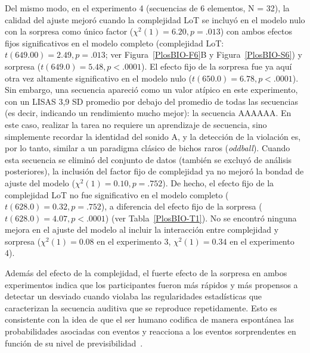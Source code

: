 Del mismo modo, en el experimento 4 (secuencias de 6 elementos, N = 32), la calidad del ajuste mejoró cuando la complejidad LoT se incluyó en el modelo nulo con la sorpresa como único factor ($\chi^2(1) = 6.20, p= .013$) con ambos efectos fijos significativos en el modelo completo (complejidad LoT: $t (649.00) = 2.49, p= .013$; ver Figura~\ref{PlosBIO-F6}B y Figura~\ref{PlosBIO-S6}) y sorpresa ($t (649.0) = 5.4 8, p < .0001$). El efecto fijo de la sorpresa fue ya aquí otra vez altamente significativo en el modelo nulo ($t (650.0) = 6.78, p < .0001$). Sin embargo, una secuencia apareció como un valor atípico en este experimento, con un LISAS 3,9 SD promedio por debajo del promedio de todas las secuencias (es decir, indicando un rendimiento mucho mejor): la secuencia AAAAAA. En este caso, realizar la tarea no requiere un aprendizaje de secuencia, sino simplemente recordar la identidad del sonido A, y la detección de la violación es, por lo tanto, similar a un paradigma clásico de bichos raros (\textit{oddball}). Cuando esta secuencia se eliminó del conjunto de datos (también se excluyó de análisis posteriores), la inclusión del factor fijo de complejidad ya no mejoró la bondad de ajuste del modelo ($\chi^2 (1) = 0.10, p = .752$). De hecho, el efecto fijo de la complejidad LoT no fue significativo en el modelo completo ($t (628.0) = 0.32, p = .752$), a diferencia del efecto fijo de la sorpresa ($t (628.0) = 4.07, p < .0001$) (ver Tabla~\ref{PlosBIO-T1}). No se encontró ninguna mejora en el ajuste del modelo al incluir la interacción entre complejidad y sorpresa ($\chi^2(1) = 0.08$ en el experimento 3, $\chi^2(1) = 0.34$ en el experimento 4).


Además del efecto de la complejidad, el fuerte efecto de la sorpresa en ambos experimentos indica que los participantes fueron más rápidos y más propensos a detectar un desviado cuando violaba las regularidades estadísticas que caracterizan la secuencia auditiva que se reproduce repetidamente. Esto es consistente con la idea de que el ser humano codifica de manera espontánea las probabilidades asociadas con eventos y reacciona a los eventos sorprendentes en función de su nivel de previsibilidad~\cite{f19,f22}.

